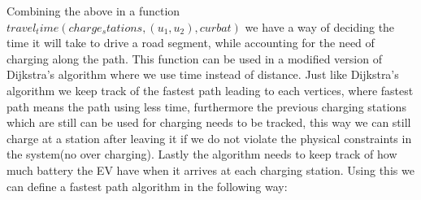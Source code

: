 Combining the above in a function $travel_time(charge_stations, (u_1, u_2), curbat)$ we have a way of deciding the time it will take to drive a road segment, while accounting for the need of charging along the path. This function can be used in a modified version of Dijkstra's algorithm where we use time instead of distance. Just like Dijkstra's algorithm we keep track of the fastest path leading to each vertices, where fastest path means the path using less time, furthermore the previous charging stations which are still can be used for charging needs to be tracked, this way we can still charge at a station after leaving it if we do not violate the physical constraints in the system(no over charging). Lastly the algorithm needs to keep track of how much battery the EV have when it arrives at each charging station. Using this we can define a fastest path algorithm in the following way: 
